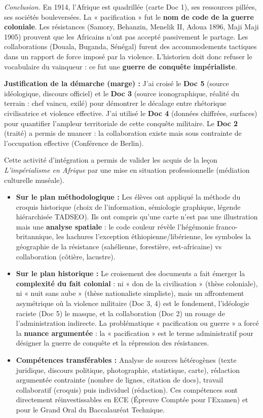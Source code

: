 \documentclass[11pt]{article}
\newcommand{\cle}[1]{{\popxbold\color{popdark}#1}}
\newcounter{popsec}
\newcounter{popsub}
\newcommand{\courssub}[1]{%
  \stepcounter{popsub}%
  \par\vspace{9pt}\noindent{\popxbold\fontsize{11.5}{13}\selectfont\color{popink}{\color{poporange}\thepopsec.\thepopsub}\hspace{6pt}#1}\par\nopagebreak\vspace{4pt}
}
\begin{document}
\begin{exoresolu}
\textit{Conclusion.} En 1914, l'Afrique est quadrillée (carte Doc 1), ses ressources pillées, ses sociétés bouleversées. La « pacification » fut le \textbf{nom de code de la guerre coloniale}. Les résistances (Samory, Behanzin, Menelik II, Adoua 1896, Maji Maji 1905) prouvent que les Africains n'ont pas accepté passivement le partage. Les collaborations (Douala, Buganda, Sénégal) furent des accommodements tactiques dans un rapport de force imposé par la violence. L'historien doit donc refuser le vocabulaire du vainqueur : ce fut une \textbf{guerre de conquête impérialiste}.

\textbf{Justification de la démarche (marge) :} J'ai croisé le \textbf{Doc 5} (source idéologique, discours officiel) et le \textbf{Doc 3} (source iconographique, réalité du terrain : chef vaincu, exilé) pour démontrer le décalage entre rhétorique civilisatrice et violence effective. J'ai utilisé le \textbf{Doc 4} (données chiffrées, surfaces) pour quantifier l'ampleur territoriale de cette conquête militaire. Le \textbf{Doc 2} (traité) a permis de nuancer : la collaboration existe mais sous contrainte de l'occupation effective (Conférence de Berlin).
\end{exoresolu}

\courssub{Bilan de l'activité}
Cette activité d'intégration a permis de valider les acquis de la leçon \emph{L'impérialisme en Afrique} par une mise en situation professionnelle (médiation culturelle muséale).
\begin{itemize}
    \item \textbf{Sur le plan méthodologique :} Les élèves ont appliqué la \cle{méthode du croquis historique} (choix de l'information, sémiologie graphique, légende hiérarchisée TADSEO). Ils ont compris qu'une carte n'est pas une illustration mais une \textbf{analyse spatiale} : le code couleur révèle l'hégémonie franco-britannique, les hachures l'exception éthiopienne/libérienne, les symboles la géographie de la résistance (sahélienne, forestière, est-africaine) vs collaboration (côtière, lacustre).
    \item \textbf{Sur le plan historique :} Le croisement des documents a fait émerger la \textbf{complexité du fait colonial} : ni « don de la civilisation » (thèse coloniale), ni « nuit sans aube » (thèse nationaliste simpliste), mais un affrontement asymétrique où la violence militaire (Doc 3, 4) est le fondement, l'idéologie raciste (Doc 5) le masque, et la collaboration (Doc 2) un rouage de l'administration indirecte. La problématique « pacification ou guerre » a forcé la \textbf{nuance argumentée} : la « pacification » est le terme administratif pour désigner la guerre de conquête et la répression des résistances.
    \item \textbf{Compétences transférables :} Analyse de sources hétérogènes (texte juridique, discours politique, photographie, statistique, carte), rédaction argumentée contrainte (nombre de lignes, citation de docs), travail collaboratif (croquis) puis individuel (rédaction). Ces compétences sont directement réinvestissables en ECE (Épreuve Comptée pour l'Examen) et pour le Grand Oral du Baccalauréat Technique.
\end{itemize}
\end{document}
